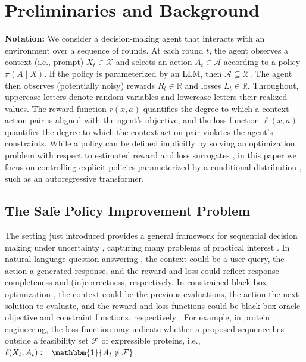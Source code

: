 \section{Preliminaries and Background}
\label{sec:background}

\textbf{Notation:} We consider a decision-making agent that interacts with an environment over a sequence of rounds. At each round $t$, the agent observes a context (i.e., prompt) $X_t \in \mathcal{X}$ and selects an action $A_t \in \mathcal{A}$ according to a policy $\pi(A \mid X)$.
If the policy is parameterized by an LLM, then $\mathcal{A} \subseteq \mathcal{X}$.
The agent then observes (potentially noisy) rewards $R_t \in \mathbb{R}$ and losses $L_t \in \mathbb{R}$.
Throughout, uppercase letters denote random variables and lowercase letters their realized values.
The reward function $r(x, a)$ quantifies the degree to which a context-action pair is aligned with the agent's objective, and the loss function $\ell(x, a)$ quantifies the degree to which the context-action pair violates the agent's constraints.
While a policy can be defined implicitly by solving an optimization problem with respect to estimated reward and loss surrogates \citep{watkins1992q, jones1998efficient}, in this paper we focus on controlling explicit policies parameterized by a conditional distribution \citep{williams1992simple}, such as an autoregressive transformer. 

\subsection{The Safe Policy Improvement Problem}
The setting just introduced provides a general framework for sequential decision making under uncertainty \citep{langford2008epoch}, capturing many problems of practical interest \citep{li2010contextual}.
In natural language question answering \citep{rajpurkar2016squad}, the context could be a user query, the action a generated response, and the reward and loss could reflect response completeness and (in)correctness, respectively.
In constrained black-box optimization \citep{gardner2014bayesian}, the context could be the previous evaluations, the action the next solution to evaluate, and the reward and loss functions could be black-box oracle objective and constraint functions, respectively \citep{chen2025generalists}.
For example, in protein engineering, the loss function may indicate whether a proposed sequence lies outside a feasibility set $\mathcal{F}$ of expressible proteins, i.e., $\ell(X_t, A_t) := \mathbbm{1}\{A_t \notin \mathcal{F}\}$.

